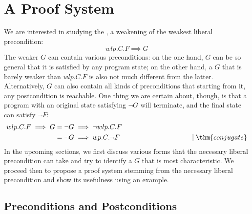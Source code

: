 \chapter{A Proof System}\label{ch:system} %





We are interested in studying the , a weakening of the weakest liberal precondition: 
$$wlp.C.F\implies G$$
The weaker $G$ can contain various preconditions: on the one hand, $G$ can be so general that it is satisfied by any program state; on the other hand, a $G$ that is barely weaker than $wlp.C.F$ is also not much different from the latter. 
Alternatively, $G$ can also contain all kinds of preconditions that starting from it, any postcondition is reachable. 
One thing we are certain about, though, is that a program with an original state satisfying $\neg G$ will terminate, and the final state can satisfy $\neg F$: 
\begin{align*}
wlp.C.F\implies G & = \neg G \implies \neg wlp.C.F \\
	& = \neg G \implies wp.C.\neg F 
	\hspace{0.3\textwidth} \mid {\thm{conjugate}}
\end{align*}
In the upcoming sections, we first discuss various forms that the necessary liberal precondition can take and try to identify a $G$ that is most characteristic. 
We proceed then to propose a proof system stemming from the necessary liberal precondition and show its usefulness using an example. 

\section{Preconditions and Postconditions}
